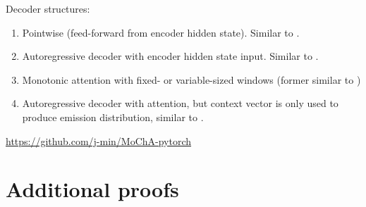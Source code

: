 \documentclass{article}
\begin{document}
Decoder structures:
%
\begin{enumerate}
    \item Pointwise (feed-forward from encoder hidden state). Similar to
          \citet{luoLearningOnlineAlignments2017,lawsonLearningHardAlignments2018}.
    \item Autoregressive decoder with encoder hidden state input. Similar to
          \citet{raffelOnlineLineartimeAttention2017}.
    \item Monotonic attention with fixed- or variable-sized windows
          (former similar to \citet{chiuMonotonicChunkwiseAttention2018})
    \item Autoregressive decoder with attention, but context vector is only
          used to produce emission distribution, similar to
          \citet{wuHardNonmonotonicAttention10,wuExactHardMonotonic2019}.
\end{enumerate}
%

\url{https://github.com/j-min/MoChA-pytorch}




\appendix

\section{Additional proofs} \label{sec:proofs}
\end{document}
